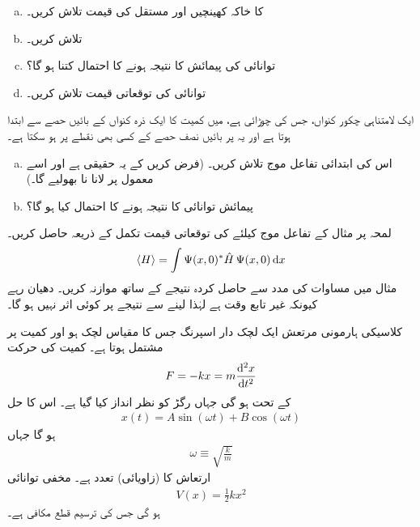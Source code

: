 \begin{enumerate}[a.]
\item 
{} کا خاکہ کھینچیں اور مستقل  کی قیمت تلاش کریں۔
\item  
{} تلاش کریں۔
\item  
توانائی کی پیمائش کا نتیجہ  ہونے کا احتمال کتنا ہو گا؟
\item 
توانائی کی توقعاتی قیمت تلاش کریں۔
\end{enumerate}
ایک لامتناہی چکور  کنواں، جس کی چوڑائی  ہے، میں کمیت  کا ایک ذرہ کنواں کے بائیں حصے سے ابتدا ہوتا ہے اور یہ  پر بائیں نصف حصے کے کسی بھی نقطے پر ہو سکتا ہے۔
\begin{enumerate}[a.]
\item
اس کی ابتدائی تفاعل موج  تلاش کریں۔ (فرض کریں کے یہ حقیقی ہے اور اسے معمول پر لانا نا بھولیے گا۔)
\item 
پیمائش توانائی کا نتیجہ  ہونے کا احتمال کیا ہو گا؟ 
\end{enumerate} 
لمحہ   پر مثال  کے تفاعل موج کیلئے  کی توقعاتی قیمت تکمل کے ذریعہ حاصل کریں۔ 
\begin{align*}
\langle H \rangle=\int \Psi(x,0)^*\hat{H}\, \Psi(x,0)\dif x
\end{align*}
مثال  میں مساوات  کی مدد سے حاصل کردہ نتیجے کے ساتھ موازنہ کریں۔ دھیان رہے کیونکہ   غیر تابع وقت ہے لہٰذا  لینے سے نتیجے پر کوئی اثر نہیں ہو گا۔ 

کلاسیکی ہارمونی مرتعش ایک لچک دار اسپرنگ جس کا مقیاس لچک  ہو  اور  کمیت   پر مشتمل ہوتا ہے۔ کمیت کی حرکت  
\begin{align*}
F=-kx=m\frac{\dif{^{2}x}}{\dif{t^{2}}}
\end{align*}
کے تحت ہو گی جہاں رگڑ کو نظر انداز کیا گیا ہے۔ اس کا حل
\begin{align*}
x(t)=A\sin(\omega t)+B\cos(\omega t)
\end{align*}
ہو گا جہاں
\begin{align}\label{مساوات_شروڈنگر_زاویائی_تعدد}
\omega\equiv \sqrt{\frac{k}{m}}
\end{align}
ارتعاش کا (زاویائی) تعدد ہے۔ مخفی توانائی
\begin{align}
V(x)=\frac{1}{2}kx^{2}
\end{align}
ہو گی جس کی ترسیم قطع مکافی ہے۔ 

